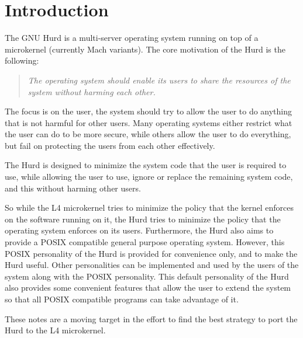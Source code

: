 \chapter{Introduction}

The GNU Hurd is a multi-server operating system running on top of a
microkernel (currently Mach variants).  The core motivation of the
Hurd is the following:

\begin{quote}
  \emph{The operating system should enable its users to share the
    resources of the system without harming each other.}
\end{quote}

The focus is on the user, the system should try to allow the user to
do anything that is not harmful for other users.  Many operating
systems either restrict what the user can do to be more secure, while
others allow the user to do everything, but fail on protecting the
users from each other effectively.

The Hurd is designed to minimize the system code that the user is
required to use, while allowing the user to use, ignore or replace the
remaining system code, and this without harming other users.

So while the L4 microkernel tries to minimize the policy that the
kernel enforces on the software running on it, the Hurd tries to
minimize the policy that the operating system enforces on its users.
Furthermore, the Hurd also aims to provide a POSIX compatible general
purpose operating system.  However, this POSIX personality of the Hurd
is provided for convenience only, and to make the Hurd useful.  Other
personalities can be implemented and used by the users of the system
along with the POSIX personality.  This default personality of the
Hurd also provides some convenient features that allow the user to
extend the system so that all POSIX compatible programs can take
advantage of it.

These notes are a moving target in the effort to find the best
strategy to port the Hurd to the L4 microkernel.

\begin{comment}
  Remarks about the history of a certain feature and implementation
  details are set in a smaller font and separated from the main text,
  just like this paragraph.  Because this is work in progress, there
  are naturally a lot of such comments.
\end{comment}



